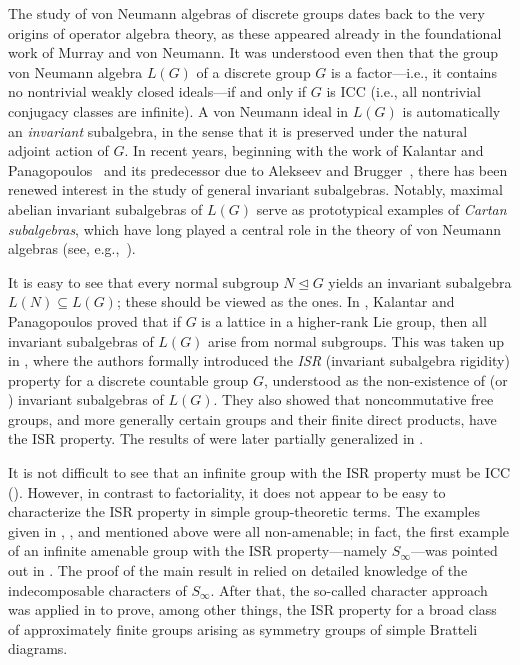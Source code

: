 \documentclass[11pt]{amsart}
\theoremstyle{plain}
\theoremstyle{definition}
\theoremstyle{remark}
\numberwithin{equation}{section}
\begin{document}
The study of von Neumann algebras of discrete groups dates back to the very origins of operator algebra theory, as these  appeared already in the foundational work of Murray and von Neumann. It was understood even then that the group von Neumann algebra \( L(G) \) of a discrete group \( G \) is a factor---i.e., it contains no nontrivial weakly closed ideals---if and only if \( G \) is ICC (i.e., all nontrivial conjugacy classes are infinite). A von Neumann ideal in \( L(G) \) is automatically an \emph{invariant} subalgebra, in the sense that it is preserved under the natural adjoint action of \( G \). In recent years, beginning with the work of Kalantar and Panagopoulos~\cite{kalantar2022invariant} and its predecessor due to Alekseev and Brugger~\cite{alekseev2019rigidity}, there has been renewed interest in the study of general invariant subalgebras. Notably, maximal abelian invariant subalgebras of \( L(G) \) serve as prototypical examples of \emph{Cartan subalgebras}, which have long played a central role in the theory of von Neumann algebras (see, e.g.,~\cites{feldman1977ergodic,popa1983maximal}).

It is easy to see that every normal subgroup \( N \trianglelefteq G \) yields an invariant subalgebra \( L(N) \subseteq L(G) \); these should be viewed as the  ones. In \cite{kalantar2022invariant}, Kalantar and Panagopoulos proved that if \( G \) is a lattice in a higher-rank Lie group, then all invariant subalgebras of \( L(G) \) arise from normal subgroups. This was taken up in \cite{amrutam2023invariant}, where the authors formally introduced the \emph{ISR} (invariant subalgebra rigidity) property for a discrete countable group \( G \), understood as the non-existence of  (or ) invariant subalgebras of \( L(G) \). They also showed that noncommutative free groups, and more generally certain  groups and their finite direct products, have the ISR property. The results of \cite{amrutam2023invariant} were later partially generalized in \cite{chifan2022invariant}.
 

It is not difficult to see that an infinite group with the ISR property must be ICC (\cite[Proposition~3.1]{amrutam2023invariant}). However, in contrast to factoriality, it does not appear to be easy to characterize the ISR property in simple group-theoretic terms. The examples given in \cite{kalantar2022invariant}, \cite{amrutam2023invariant}, and \cite{chifan2022invariant} mentioned above were all non-amenable; in fact, the first example of an infinite amenable group with the ISR property—namely \( S_\infty \)—was pointed out in \cite{jz}. The proof of the main result in \cite{jz} relied on detailed knowledge of the indecomposable characters of \( S_\infty \). After that, the so-called character approach was applied in \cite{dudko2024character} to prove, among other things, the ISR property for a broad class of approximately finite groups arising as symmetry groups of simple Bratteli diagrams. 
\end{document}
